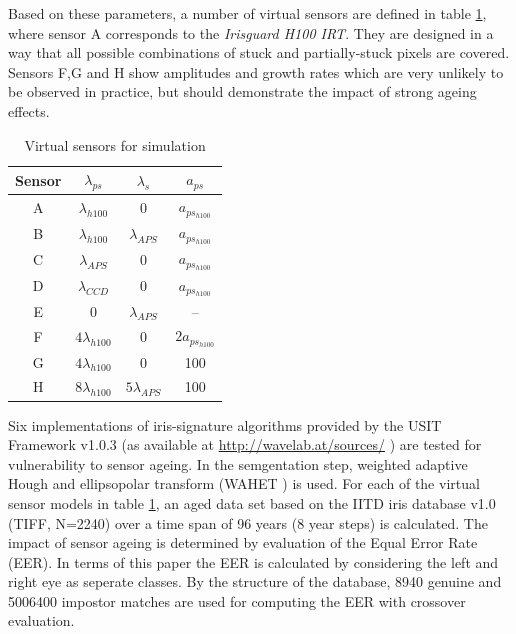 \documentclass[10pt,twocolumn,letterpaper]{article}
\begin{document}
\egroup

 Based on these parameters, a number of virtual sensors are defined in table \ref{table:tests}, where sensor A corresponds to the \emph{Irisguard H100 IRT}. They are designed in a way that all possible combinations of stuck and partially-stuck pixels are covered. Sensors F,G and H show amplitudes and growth rates which are very unlikely to be observed in practice, but should demonstrate the impact of strong ageing effects. 
 
 \begin{table}[bt]  
  \begin{center}
  \begin{tabular}{c | c c c }
  Sensor & $\lambda_{ps}$ & $\lambda_{s}$ & $a_{ps}$  \\
  \hline
  A	&	$\lambda_{h100}$ & 0 & $a_{ps_{h100}}$ \\
  B & $\lambda_{h100}$ & $\lambda_{APS}$ & $a_{ps_{h100}}$ \\
  C & $\lambda_{APS}$ & 0 & $a_{ps_{h100}}$    \\
  D & $\lambda_{CCD}$ & 0 & $a_{ps_{h100}}$   \\
  E & 0 & $\lambda_{APS}$ & -- \\
  F & $ 4 \lambda_{h100}$ & 0 & $ 2 a_{ps_{h100}}$ \\
  G & $ 4 \lambda_{h100}$ & 0 & 100 \\
  H & $ 8 \lambda_{h100}$ &  $ 5 \lambda_{APS}$ & 100

  \end{tabular}
    
    \vspace{3mm}
    \caption{Virtual sensors for simulation}
    \label{table:tests}
  \end{center}
 \end{table}
  
  Six implementations 
  of iris-signature algorithms provided by the USIT Framework v1.0.3 (as available at \url{http://wavelab.at/sources/} \cite{rathgeb}) are tested for vulnerability to sensor ageing. In the semgentation step, weighted adaptive Hough and ellipsopolar transform (WAHET \cite{wahet}) is used. For each of the virtual sensor models in table \ref{table:tests}, an aged data set based on the IITD iris database v1.0 (TIFF, N=2240) \cite{IITD} over a time span of 96 years (8 year steps) is calculated. The impact of sensor ageing is determined by evaluation of the Equal Error Rate (EER). In terms of this paper the EER is calculated by considering the left and right eye as seperate classes. By the structure of the database, 8940 genuine and 5006400 impostor matches are used for computing the EER with crossover evaluation.
  
\end{document}

